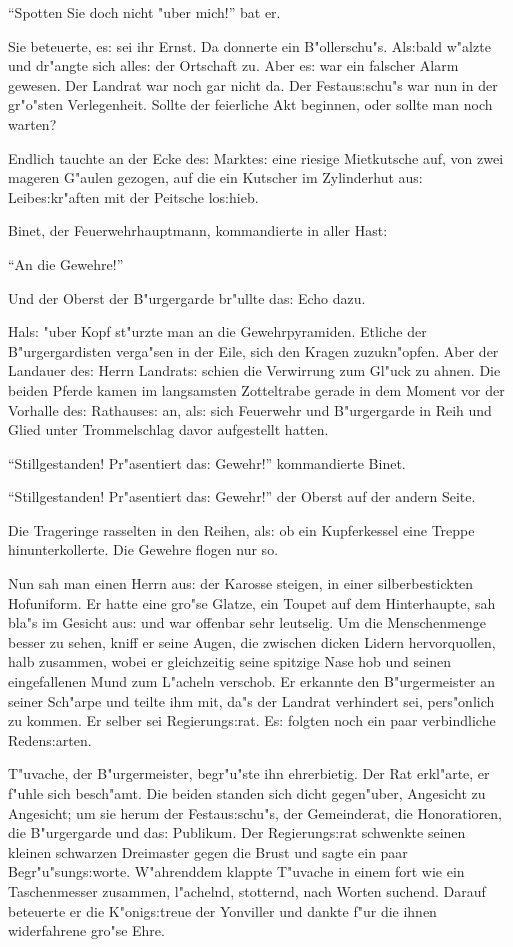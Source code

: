 \documentclass[oneside,12pt]{book}
\newcommand{\s}{s:}%
\begin{document}
"`Spotten Sie doch nicht "uber mich!"' bat er.

Sie beteuerte, e{\s} sei ihr Ernst. Da donnerte ein B"ollerschu"s.
Al{\s}bald w"alzte und dr"angte sich alle{\s} der Ortschaft zu.
Aber e{\s} war ein falscher Alarm gewesen. Der Landrat war noch
gar nicht da. Der Festau{\s}schu"s war nun in der gr"o"sten
Verlegenheit. Sollte der feierliche Akt beginnen, oder sollte man
noch warten?

Endlich tauchte an der Ecke de{\s} Markte{\s} eine riesige
Mietkutsche auf, von zwei mageren G"aulen gezogen, auf die ein
Kutscher im Zylinderhut au{\s} Leibe{\s}kr"aften mit der Peitsche
lo{\s}hieb.

Binet, der Feuerwehrhauptmann, kommandierte in aller Hast:

"`An die Gewehre!"'

Und der Oberst der B"urgergarde br"ullte da{\s} Echo dazu.

Hal{\s} "uber Kopf st"urzte man an die Gewehrpyramiden. Etliche
der B"urgergardisten verga"sen in der Eile, sich den Kragen
zuzukn"opfen. Aber der Landauer de{\s} Herrn Landrat{\s} schien
die Verwirrung zum Gl"uck zu ahnen. Die beiden Pferde kamen im
langsamsten Zotteltrabe gerade in dem Moment vor der Vorhalle
de{\s} Rathause{\s} an, al{\s} sich Feuerwehr und B"urgergarde in
Reih und Glied unter Trommelschlag davor aufgestellt hatten.

"`Stillgestanden! Pr"asentiert da{\s} Gewehr!"' kommandierte
Binet.

"`Stillgestanden! Pr"asentiert da{\s} Gewehr!"' der Oberst auf der
andern Seite.

Die Trageringe rasselten in den Reihen, al{\s} ob ein Kupferkessel
eine Treppe hinunterkollerte. Die Gewehre flogen nur so.

Nun sah man einen Herrn au{\s} der Karosse steigen, in einer
silberbestickten Hofuniform. Er hatte eine gro"se Glatze, ein
Toupet auf dem Hinterhaupte, sah bla"s im Gesicht au{\s} und war
offenbar sehr leutselig. Um die Menschenmenge besser zu sehen,
kniff er seine Augen, die zwischen dicken Lidern hervorquollen,
halb zusammen, wobei er gleichzeitig seine spitzige Nase hob und
seinen eingefallenen Mund zum L"acheln verschob. Er erkannte den
B"urgermeister an seiner Sch"arpe und teilte ihm mit, da"s der
Landrat verhindert sei, pers"onlich zu kommen. Er selber sei
Regierung{\s}rat. E{\s} folgten noch ein paar verbindliche
Reden{\s}arten.

T"uvache, der B"urgermeister, begr"u"ste ihn ehrerbietig. Der Rat
erkl"arte, er f"uhle sich besch"amt. Die beiden standen sich dicht
gegen"uber, Angesicht zu Angesicht; um sie herum der
Festau{\s}schu"s, der Gemeinderat, die Honoratioren, die
B"urgergarde und da{\s} Publikum. Der Regierung{\s}rat schwenkte
seinen kleinen schwarzen Dreimaster gegen die Brust und sagte ein
paar Begr"u"sung{\s}worte. W"ahrenddem klappte T"uvache in einem
fort wie ein Taschenmesser zusammen, l"achelnd, stotternd, nach
Worten suchend. Darauf beteuerte er die K"onig{\s}treue der
Yonviller und dankte f"ur die ihnen widerfahrene gro"se Ehre.
\end{document}
